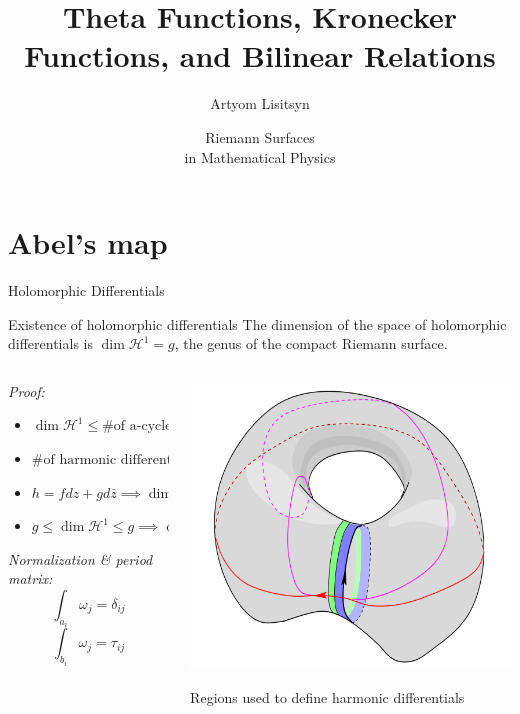 \documentclass[11pt,aspectratio=169]{beamer}
\title{Theta Functions, Kronecker Functions, and Bilinear Relations}
\date[2023]{Riemann Surfaces \\ in Mathematical Physics}
\author{Artyom Lisitsyn}
\institute{D-PHYS}
\begin{document}
\def\titlefigure{elements/title-page-image}
\titleframe

\tocframe

\section{Abel's map}

\begin{frame}{Holomorphic Differentials}
    \begin{block}{Existence of holomorphic differentials}
        The dimension of the space of holomorphic differentials is $\dim \mathcal H^1 = g$, the genus of the compact Riemann surface.
    \end{block}

    \begin{columns}[onlytextwidth]
        \begin{column}{0.55\textwidth}
            \emph{Proof:}
            \begin{itemize}
                \item $\dim \mathcal H^1 \leq \text{\# of a-cycles} = g$
                \item $\text{\# of harmonic differentials} = \dim H \geq 2g$
                \item $h = f dz + g d \bar z \implies \dim H = 2 \dim \mathcal H^1$
                \item $g \leq \dim \mathcal H^1 \leq g \implies \dim \mathcal H^1 = g$
            \end{itemize}
            \emph{Normalization \& period matrix:}
            \[ \int_{a_i} \omega_j = \delta_{ij} \]
            \[ \int_{b_i} \omega_j = \tau_{ij} \]
        \end{column}
        \begin{column}{0.45\textwidth}
            \center
            \includegraphics[width=0.8\columnwidth]{assets/HarmonicDifferential.png}
            
            \tiny Regions used to define harmonic differentials

            \cite{Ber06}
        \end{column}
    \end{columns}
\end{frame}
\end{document}
